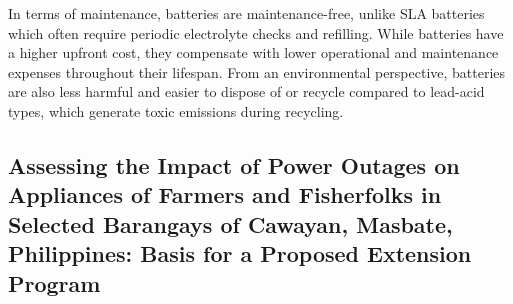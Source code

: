{In terms of maintenance,  batteries are maintenance-free, unlike SLA batteries which often require periodic electrolyte checks and refilling. While   batteries have a higher upfront cost, they compensate with lower operational and maintenance expenses throughout their lifespan. From an environmental perspective,   batteries are also less harmful and easier to dispose of or recycle compared to lead-acid types, which generate toxic emissions during recycling.

\subsection{Assessing the Impact of Power Outages on Appliances of Farmers and Fisherfolks in Selected Barangays of Cawayan, Masbate, Philippines: Basis for a Proposed Extension Program}

}

